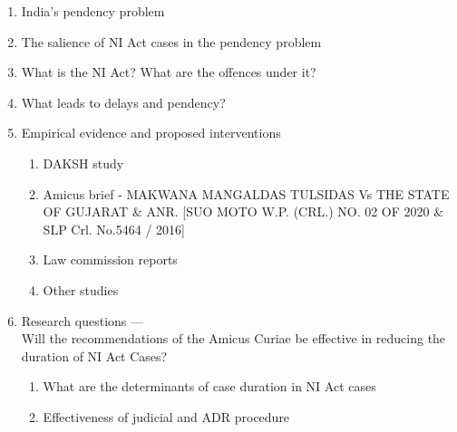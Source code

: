 \begin{enumerate}
\item India's pendency problem
\item The salience of NI Act cases in the pendency problem
\item What is the NI Act? What are the offences under it?
\item What leads to delays and pendency?
\item Empirical evidence and proposed interventions
  \begin{enumerate}
  \item DAKSH study
  \item Amicus brief - MAKWANA MANGALDAS TULSIDAS Vs THE STATE OF
    GUJARAT \& ANR. [SUO MOTO W.P. (CRL.) NO. 02 OF 2020 \& SLP
    Crl. No.5464 / 2016]
  \item Law commission reports
  \item Other studies
  \end{enumerate}
\item Research questions ---\\
  Will the recommendations of the Amicus Curiae be effective in
  reducing the duration of NI Act Cases?
  \begin{enumerate}
  \item What are the determinants of case duration in NI Act cases
  \item Effectiveness of judicial and ADR procedure
  \end{enumerate}
\end{enumerate}


